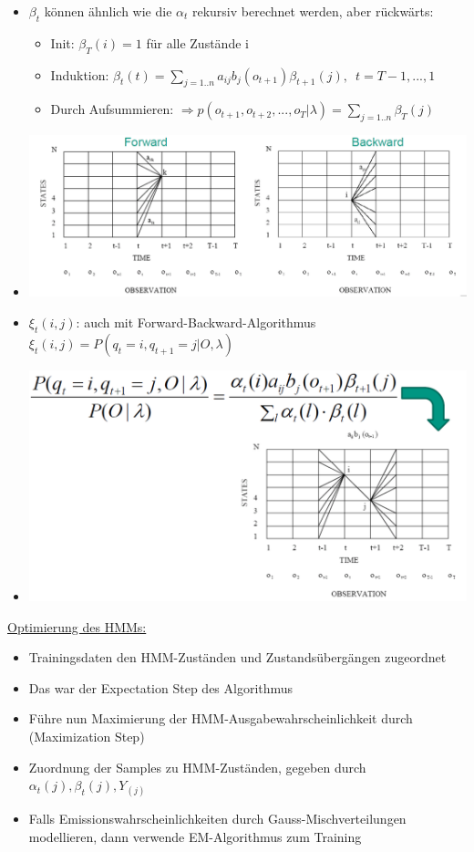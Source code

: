 \documentclass[a4paper,10pt,oneside]{article}
\begin{document}
\begin{itemize}
\begin{itemize}
				\item $\beta_t$ können ähnlich wie die $\alpha_t$ rekursiv berechnet werden, aber rückwärts:
					\begin{itemize}
						\item Init: $\beta_T(i) = 1$ für alle Zustände i
						\item Induktion: $\beta_t(t) = \sum_{j=1..n} a_{ij} b_j (o_{t+1})\beta_{t+1}(j), \enspace t=T-1,..., 1$
						\item Durch Aufsummieren: $\Rightarrow p(o_{t+1},o_{t+2},...,o_T|\lambda) = \sum_{j=1..n} \beta_T(j)$
					\end{itemize}			
				\item[] \includegraphics[scale=0.25]{Grafiken/forward-backward-beta.png}	  		 		\item $\xi_t(i,j)$: auch mit Forward-Backward-Algorithmus $\xi_t(i,j) = P(q_t = i,q_{t+1} = j|O,\lambda)$
				\item[] \includegraphics[scale=0.2]{Grafiken/xis.png}
			\end{itemize}
	\end{itemize}

\underline{Optimierung des HMMs:}
	\begin{itemize}
		\item Trainingsdaten den HMM-Zuständen und Zustandsübergängen zugeordnet
		\item Das war der Expectation Step des Algorithmus
		\item Führe nun Maximierung der HMM-Ausgabewahrscheinlichkeit durch (Maximization Step)
		\item Zuordnung der Samples zu HMM-Zuständen, gegeben durch $\alpha_t(j),\beta_t(j),Y_(j)$
		\item Falls Emissionswahrscheinlichkeiten durch Gauss-Mischverteilungen modellieren, dann verwende EM-Algorithmus zum Training
	\end{itemize}
	
\end{document}
